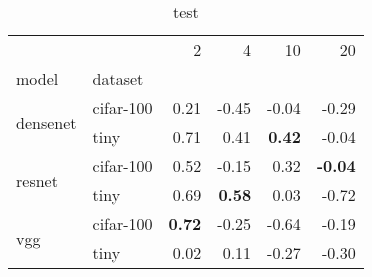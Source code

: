 \begin{table}
\caption{test}
\begin{tabular}{llrrrr}
\toprule
 &  & 2 & 4 & 10 & 20 \\
model & dataset &  &  &  &  \\
\midrule
\multirow[c]{2}{*}{densenet} & cifar-100 & 0.21 & -0.45 & -0.04 & -0.29 \\
 & tiny & 0.71 & 0.41 & \bfseries 0.42 & -0.04 \\
\multirow[c]{2}{*}{resnet} & cifar-100 & 0.52 & -0.15 & 0.32 & \bfseries -0.04 \\
 & tiny & 0.69 & \bfseries 0.58 & 0.03 & -0.72 \\
\multirow[c]{2}{*}{vgg} & cifar-100 & \bfseries 0.72 & -0.25 & -0.64 & -0.19 \\
 & tiny & 0.02 & 0.11 & -0.27 & -0.30 \\
\bottomrule
\end{tabular}
\end{table}

